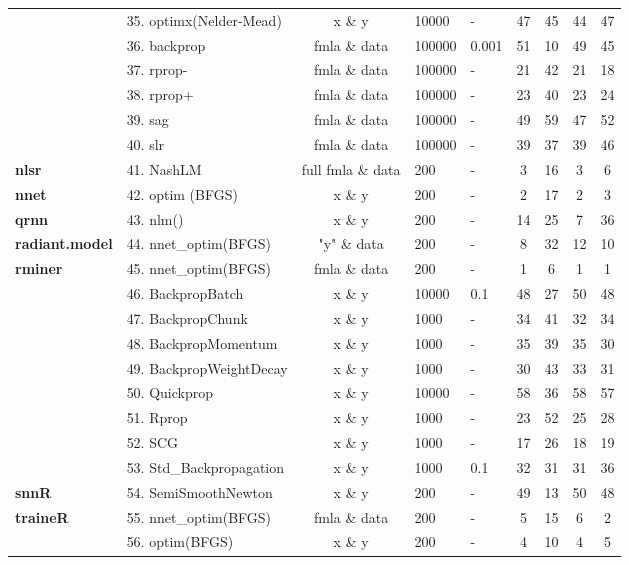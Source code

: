\begin{Schunk}
\begin{table}
\begin{tabular}[t]{>{\bfseries}llcllcccc}
\multirow{-2}{*}{\raggedright\arraybackslash monmlp} & 35. optimx(Nelder-Mead) & x \& y & 10000 & - & 47 & 45 & 44 & 47\\
\cmidrule{1-9}
 & 36. backprop & fmla \& data & 100000 & 0.001 & 51 & 10 & 49 & 45\\

 & 37. rprop- & fmla \& data & 100000 & - & 21 & 42 & 21 & 18\\

 & 38. rprop+ & fmla \& data & 100000 & - & 23 & 40 & 23 & 24\\

 & 39. sag & fmla \& data & 100000 & - & 49 & 59 & 47 & 52\\

\multirow{-5}{*}{\raggedright\arraybackslash neuralnet} & 40. slr & fmla \& data & 100000 & - & 39 & 37 & 39 & 46\\
\cmidrule{1-9}
nlsr & 41. NashLM & full fmla \& data & 200 & - & 3 & 16 & 3 & 6\\
\cmidrule{1-9}
nnet & 42. optim (BFGS) & x \& y & 200 & - & 2 & 17 & 2 & 3\\
\cmidrule{1-9}
qrnn & 43. nlm() & x \& y & 200 & - & 14 & 25 & 7 & 36\\
\cmidrule{1-9}
radiant.model & 44. nnet\_optim(BFGS) & "y" \& data & 200 & - & 8 & 32 & 12 & 10\\
\cmidrule{1-9}
rminer & 45. nnet\_optim(BFGS) & fmla \& data & 200 & - & 1 & 6 & 1 & 1\\
\cmidrule{1-9}
 & 46. BackpropBatch & x \& y & 10000 & 0.1 & 48 & 27 & 50 & 48\\

 & 47. BackpropChunk & x \& y & 1000 & - & 34 & 41 & 32 & 34\\

 & 48. BackpropMomentum & x \& y & 1000 & - & 35 & 39 & 35 & 30\\

 & 49. BackpropWeightDecay & x \& y & 1000 & - & 30 & 43 & 33 & 31\\

 & 50. Quickprop & x \& y & 10000 & - & 58 & 36 & 58 & 57\\

 & 51. Rprop & x \& y & 1000 & - & 23 & 52 & 25 & 28\\

 & 52. SCG & x \& y & 1000 & - & 17 & 26 & 18 & 19\\

\multirow{-8}{*}{\raggedright\arraybackslash RSNNS} & 53. Std\_Backpropagation & x \& y & 1000 & 0.1 & 32 & 31 & 31 & 36\\
\cmidrule{1-9}
snnR & 54. SemiSmoothNewton & x \& y & 200 & - & 49 & 13 & 50 & 48\\
\cmidrule{1-9}
traineR & 55. nnet\_optim(BFGS) & fmla \& data & 200 & - & 5 & 15 & 6 & 2\\
\cmidrule{1-9}
 & 56. optim(BFGS) & x \& y & 200 & - & 4 & 10 & 4 & 5\\


\end{tabular}
\end{table}
\end{Schunk}
